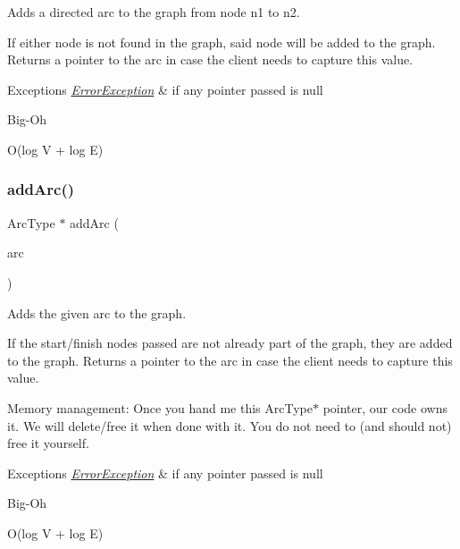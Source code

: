 Adds a directed arc to the graph from node n1 to n2. 

If either node is not found in the graph, said node will be added to the graph. Returns a pointer to the arc in case the client needs to capture this value.


\begin{DoxyExceptions}{Exceptions}
{\em \mbox{\hyperlink{classErrorException}{Error\+Exception}}} & if any pointer passed is null \\
\hline
\end{DoxyExceptions}
\begin{DoxyRefDesc}{Big-\/\+Oh}
\item[\mbox{\hyperlink{BigOh__BigOh000043}{Big-\/\+Oh}}]O(log V + log E) \end{DoxyRefDesc}
\mbox{\label{classGraph_aa1b6553e579c03260253a2d731668dfa}} 
\subsubsection{\texorpdfstring{add\+Arc()}{addArc()}\hspace{0.1cm}{\footnotesize\ttfamily [3/3]}}
{\footnotesize\ttfamily Arc\+Type $\ast$ add\+Arc (\begin{DoxyParamCaption}\item[{Arc\+Type $\ast$}]{arc }\end{DoxyParamCaption})}



Adds the given arc to the graph. 

If the start/finish nodes passed are not already part of the graph, they are added to the graph. Returns a pointer to the arc in case the client needs to capture this value.

Memory management\+: Once you hand me this Arc\+Type$\ast$ pointer, our code owns it. We will delete/free it when done with it. You do not need to (and should not) free it yourself.


\begin{DoxyExceptions}{Exceptions}
{\em \mbox{\hyperlink{classErrorException}{Error\+Exception}}} & if any pointer passed is null \\
\hline
\end{DoxyExceptions}
\begin{DoxyRefDesc}{Big-\/\+Oh}
\item[\mbox{\hyperlink{BigOh__BigOh000044}{Big-\/\+Oh}}]O(log V + log E) \end{DoxyRefDesc}
\mbox{\label{classGraph_acd763aa09491315536b5d2734cd82b89}} 
